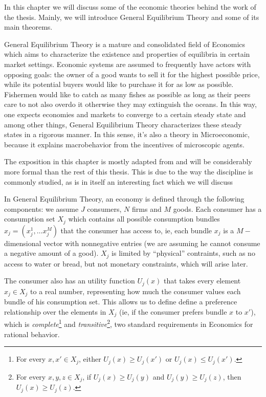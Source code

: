 In this chapter we will discuss some of the economic theories behind
the work of the thesis. Mainly, we will introduce General Equilibrium
Theory and some of its main theorems.

General Equilibrium Theory is a mature and consolidated field of
Economics \cite{Arrow54, mascolell, mckenzie} which aims to
characterize the existence and properties of equilibria in certain
market settings. Economic systems are assumed to frequently have
actors with opposing goals: the owner of a good wants to sell it for
the highest possible price, while its potential buyers would like to
purchase it for as low as possible. Fishermen would like to catch as
many fishes as possible as long as their peers care to not also overdo
it otherwise they may extinguish the oceans. In this way, one expects
economies and markets to converge to a certain steady state and among
other things, General Equilibrium Theory characterizes these steady
states in a rigorous manner. In this sense, it's also a theory in
Microeconomic, because it explains macrobehavior from the incentives
of microscopic agents.

The exposition in this chapter is mostly adapted from \cite{mascolell}
and will be considerably more formal than the rest of this
thesis. This is due to the way the discipline is commonly studied, as
is in itself an interesting fact which we will discuss 

In General Equilibrium Theory, an economy is defined through the
following components: we assume $J$ consumers, $N$ firms and $M$
goods. Each consumer has a consumption set $X_j$ which contains all
possible consumption bundles $x_j = (x_j^1, \ldots x_j^M)$ that the
consumer has access to, ie, each bundle $x_j$ is a $M-$dimensional
vector with nonnegative entries (we are assuming he cannot consume a
negative amount of a good). $X_j$ is limited by ``physical''
contraints, such as no access to water or bread, but not monetary
constraints, which will arise later.

The consumer also has an utility function $U_j(x)$ that takes every
element $x_j \in X_j$ to a real number, representing how much the
consumer values each bundle of his consumption set. This allows us to
define define a preference relationship over the elements in $X_j$
(ie, if the consumer prefers bundle $x$ to $x'$), which is
\emph{complete}\footnote{For every $x, x' \in X_j$, either
  $U_j(x) \geq U_j(x')$ or $U_j(x) \leq U_j(x')$.} and
\emph{transitive}\footnote{For every $x, y, z \in X_j$, if
  $U_j(x) \geq U_j(y)$ and $U_j(y) \geq U_j(z)$, then
  $U_j(x) \geq U_j(z)$.}, two standard requirements in Economics for
rational behavior.

